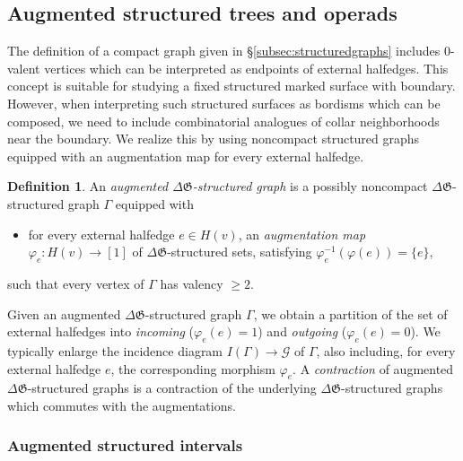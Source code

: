 \documentclass[english,11pt,leqno]{article}
\def\Gen{\mathfrak{G}}
\def\G{ {\mathcal G}}
\def\DG{ {\Delta \Gen}}
\theoremstyle{definition}
\newtheorem{defi}[thm]{Definition}
\theoremstyle{remark}
\numberwithin{equation}{section}
\begin{document}
\subsection{Augmented structured trees and operads}

The definition of a compact graph given in \S \ref{subsec:structuredgraphs} includes $0$-valent
vertices which can be interpreted as endpoints of external halfedges. This concept is suitable for studying
a fixed structured marked surface with boundary. However, when interpreting such structured surfaces as bordisms which
can be composed, we need to include combinatorial analogues of collar neighborhoods near the
boundary. We realize this by using noncompact structured graphs equipped with an augmentation map
for every external halfedge.

\begin{defi}
An {\em augmented $\DG$-structured graph} is a possibly noncompact $\DG$-structured graph $\Gamma$ equipped with
\begin{itemize}
	\item for every external halfedge $e \in H(v)$, an {\em augmentation map} $\varphi_e: H(v)
		\to [1]$ of $\DG$-structured sets, satisfying $\varphi_e^{-1}(\varphi(e)) = \{e\}$,
\end{itemize}
such that every vertex of $\Gamma$ has valency $\ge 2$.
\end{defi}

Given an augmented $\DG$-structured graph $\Gamma$, we obtain a partition of the set of external
halfedges into {\em incoming} ($\varphi_e(e) = 1$) and {\em outgoing} ($\varphi_e(e) = 0$).
We typically enlarge the incidence diagram $I(\Gamma) \to \G$ of $\Gamma$, also including, for every
external halfedge $e$, the corresponding morphism $\varphi_e$. A {\em contraction} of augmented
$\DG$-structured graphs is a contraction of the underlying $\DG$-structured graphs which commutes with
the augmentations.
 
\subsubsection{Augmented structured intervals} 
\label{subsec:interval}
\end{document}
